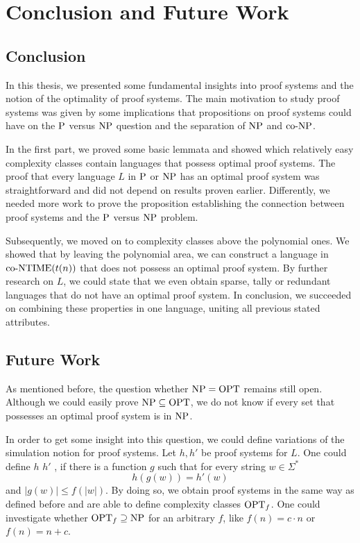 \chapter{Conclusion and Future Work}
  
  \section{Conclusion}
  
  In this thesis, we presented some fundamental insights into proof systems and the notion of the optimality of proof systems. The main motivation to study proof systems was given by some implications that propositions on proof systems could have on the \(\P\) versus \(\NP\) question and the separation of \(\NP\) and \(\coNP\).
  
  In the first part, we proved some basic lemmata and showed which relatively easy complexity classes contain languages that possess optimal proof systems. The proof that every language \(L\) in \(\P\) or \(\NP\) has an optimal proof system was straightforward and did not depend on results proven earlier. Differently, we needed more work to prove the proposition establishing the connection between proof systems and the \(\P\) versus \(\NP\) problem.
  
  Subsequently, we moved on to complexity classes above the polynomial ones. We showed that by leaving the polynomial area, we can construct a language in \(\coNTIME(t(n))\) that does not possess an optimal proof system. By further research on \(L\), we could state that we even obtain sparse, tally or redundant languages that do not have an optimal proof system. In conclusion, we succeeded on combining these properties in one language, uniting all previous stated attributes.
  
  \section{Future Work}

  As mentioned before, the question whether \(\NP = \OPT\) remains still open. Although we could easily prove \(\NP \subseteq \OPT\), we do not know if every set that possesses an optimal proof system is in \(\NP\).
  
  In order to get some insight into this question, we could define variations of the simulation notion for proof systems. Let \(h, h'\) be proof systems for \(L\). One could define \(h\)  \(h'\) , if there is a function \(g\) such that for every string \(w \in \Sigma^*\)
  \[
    h(g(w)) = h'(w)
  \]
  and \(|g(w)| \leq f(|w|)\). By doing so, we obtain  proof systems in the same way as defined before and are able to define complexity classes \(\OPT_f\). One could investigate whether \(\OPT_f \supseteq \NP\) for an arbitrary \(f\), like \(f(n) = c \cdot n\) or \(f(n) = n + c\).